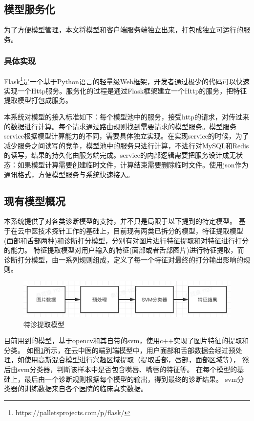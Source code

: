 \subsection{模型服务化}
为了方便模型管理，本文将模型和客户端服务端独立出来，打包成独立可运行的服务。

\subsubsection{具体实现}
Flask\footnote{https://palletsprojects.com/p/flask/}是一个基于Python语言的轻量级Web框架，开发者通过极少的代码可以快速实现一个Http服务。服务化的过程是通过Flask框架建立一个Http的服务，把特征提取模型打包成服务。

本系统对模型的接入标准如下：每个模型池中的服务，接受http的请求，对传过来的数据进行计算。每个请求通过路由规则找到需要请求的模型服务。模型服务service根据模型计算能力的不同，需要具体独立实现。在实现service的时候，为了减少服务之间读写的竞争，模型池中的服务只进行计算，不进行对MySQL和Redis的读写，结果的持久化由服务端完成。service的内部逻辑需要把服务设计成无状态：如果模型计算需要创建临时文件，计算结束需要删除临时文件。使用json作为通讯格式，方便模型服务与系统快速接入。

\subsection{现有模型概况}
本系统提供了对各类诊断模型的支持，并不只是局限于以下提到的特定模型。
基于在云中医技术探针工作的基础上，目前现有两类已拆分的模型，特征提取模型(面部和舌部两种)和诊断打分模型，分别有对图片进行特征提取和对特征进行打分的能力。
特征提取模型对用户输入的特征(面部或者舌部图片)进行特征提取，而诊断打分模型，由一系列规则组成，定义了每一个特征对最终的打分输出影响的规则。

\begin{figure}[ht]
    \centering
    \includegraphics[width=15cm]{images/model.png}
    \caption{特诊提取模型}
    \label{fig:my_model}
\end{figure}
目前用到的模型，基于opencv和其自带的svm，使用c++实现了图片特征的提取和分类。
如图\ref{fig:my_model}所示，在云中医的端到端模型中，用户面部和舌部数据会经过预处理，如使用高斯混合模型进行兴趣区域提取（提取舌部，唇部，面部区域等），
然后由svm分类器，判断该样本中是否包含嘴唇、嘴唇的特征等。
在每个模型的基础上，最后由一个诊断规则根据每个模型的输出，得到最终的诊断结果。
svm分类器的训练数据来自各个医院的临床真实数据。

